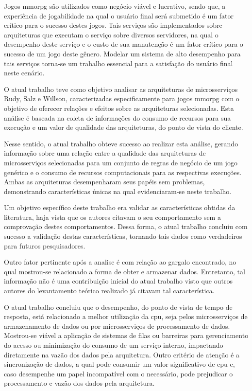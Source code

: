 Jogos \ac{mmorpg} são utilizados como negócio viável e lucrativo, sendo que, a experiência de jogabilidade na qual o usuário final será submetido é um fator crítico para o sucesso destes jogos.
%
Tais serviços são implementados sobre arquiteturas que executam o serviço sobre diversos servidores, na qual o desempenho deste serviço e o custo de sua manutenção é um fator crítico para o sucesso de um jogo deste gênero.
%
Modelar um sistema de alto desempenho para tais serviços torna-se um trabalho essencial para a satisfação do usuário final neste cenário.


O atual trabalho teve como objetivo analisar as arquiteturas de microsserviços Rudy, Salz e Willson, caracterizadas especificamente para jogos \ac{mmorpg} com o objetivo de oferecer relações e efeitos sobre as arquiteturas selecionadas.
%
Esta análise é baseada na coleta de informações do consumo de recursos para sua execução e um valor de qualidade das arquiteturas, do ponto de vista do cliente.

Nesse sentido, o atual trabalho obteve sucesso ao realizar esta análise, gerando informação sobre uma relação entre a qualidade das arquiteturas de microsserviços selecionadas para um conjunto de regras de negócio de um jogo genérico e o consumo de recursos computacionais para as respectivas execuções.
%
Ambas as arquiteturas desempenharam seus papéis sem problemas, demonstrando características únicas na qual evidenciaram-se neste trabalho.

Um objetivo específico deste trabalho era validar as características obtidas da literatura, haja vista que os autores citavam o seu comportamento sem a comprovação destes comportamentos.
%
Dessa forma, o atual trabalho concluiu com sucesso a validação destas características, tornando tais dados como verdadeiros para futuros pesquisadores.

Outro fator pertinente após a analise é com relação ao gargalo encontrado, no qual mostrou-se relacionado a forma de obter e armazenar dados.
%
Entretanto, tal informação não é uma contribuição inicial do atual trabalho visto que outros autores do levantamento teórico realizado já citavam tal característica.

O atual trabalho concluiu que o desempenho, do ponto de vista de tempo de resposta, está relacionado a melhor utilização da \ac{cpu}, seja pelos microsserviços de armazenamento de dados ou por microsserviços de processamento de dados.
%
Mostrou-se viável a aplicação de sistemas de filas ou barreiras para gerenciamento do acesso ou minimização do consumo de um serviço interno, impactando diretamente na vazão dos dados pela arquitetura.
%
Outro critério de atenção é a sincronização de dados, a qual pode consumir um valor significativo de \ac{cpu} e, caso desempenhe um papel incompatível com o necessário, pode prejudicar o processamento e vazão dos dados pela arquitetura.

